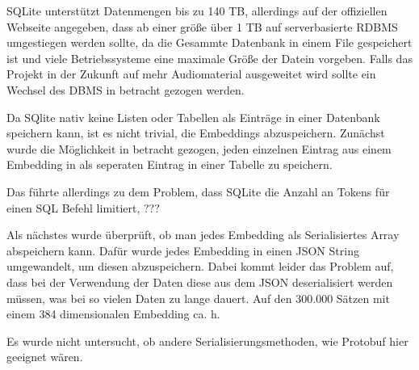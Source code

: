 SQLite unterstützt Datenmengen bis zu 140 TB, allerdings auf der offiziellen Webseite angegeben, dass ab einer größe über 1 TB auf serverbasierte RDBMS umgestiegen werden sollte, da die Gesammte Datenbank in einem File gespeichert ist und viele Betriebssysteme eine maximale Größe der Datein vorgeben.
Falls das Projekt in der Zukunft auf mehr Audiomaterial ausgeweitet wird sollte ein Wechsel des DBMS in betracht gezogen werden.

Da SQlite nativ keine Listen oder Tabellen als Einträge in einer Datenbank speichern kann, ist es nicht trivial, die Embeddings abzuspeichern.
Zunächst wurde die Möglichkeit in betracht gezogen, jeden einzelnen Eintrag aus einem Embedding in als seperaten Eintrag in einer Tabelle zu speichern. 

Das führte allerdings zu dem Problem, dass SQLite die Anzahl an Tokens für einen SQL Befehl limitiert, ???

Als nächstes wurde überprüft, ob man jedes Embedding als Serialisiertes Array abspeichern kann.
Dafür wurde jedes Embedding in einen JSON String umgewandelt, um diesen abzuspeichern. 
Dabei kommt leider das Problem auf, dass bei der Verwendung der Daten diese aus dem JSON deserialisiert werden müssen, was bei so vielen Daten zu lange dauert.
Auf den 300.000 Sätzen mit einem 384 dimensionalen Embedding ca. h.

Es wurde nicht untersucht, ob andere Serialisierungsmethoden, wie Protobuf hier geeignet wären.

